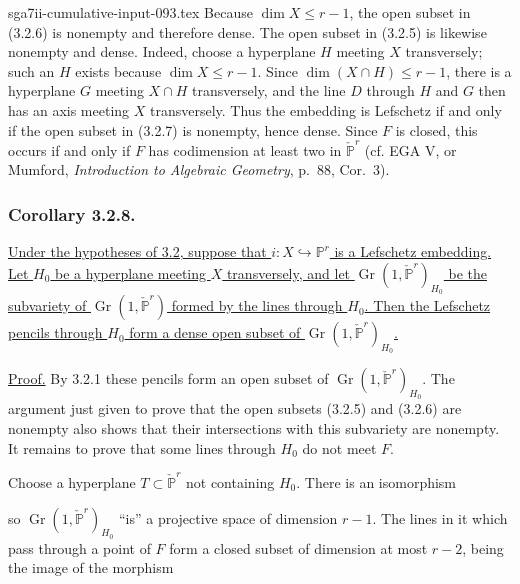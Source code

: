 \begin{filecontents*}{sga7ii-cumulative-input-093.tex}
Because $\dim X\leq r-1$, the open subset in (3.2.6) is nonempty and
therefore dense.  The open subset in (3.2.5) is likewise nonempty and
dense.  Indeed, choose a hyperplane $H$ meeting $X$ transversely; such
an $H$ exists because $\dim X\leq r-1$.  Since
$\dim(X\cap H)\leq r-1$, there is a hyperplane $G$ meeting
$X\cap H$ transversely, and the line $D$ through $H$ and $G$ then has
an axis meeting $X$ transversely.  Thus the embedding is Lefschetz if
and only if the open subset in (3.2.7) is nonempty, hence dense.  Since
$F$ is closed, this occurs if and only if $F$ has codimension at least
two in $\check{\mathbb P}^{r}$ (cf. EGA V, or Mumford,
\emph{Introduction to Algebraic Geometry}, p.~88, Cor.~3).

\subsubsection*{Corollary 3.2.8.}
\underline{Under the hypotheses of 3.2, suppose that
$i:X\hookrightarrow\mathbb P^r$ is a Lefschetz embedding.  Let $H_0$
be a hyperplane meeting $X$ transversely, and let
$\operatorname{Gr}(1,\check{\mathbb P}^{r})_{H_0}$ be the subvariety
of $\operatorname{Gr}(1,\check{\mathbb P}^{r})$ formed by the lines
through $H_0$.  Then the Lefschetz pencils through $H_0$ form a dense
open subset of $\operatorname{Gr}(1,\check{\mathbb P}^{r})_{H_0}$.}

\noindent\underline{Proof.}
By 3.2.1 these pencils form an open subset of
$\operatorname{Gr}(1,\check{\mathbb P}^{r})_{H_0}$.  The argument
just given to prove that the open subsets (3.2.5) and (3.2.6) are
nonempty also shows that their intersections with this subvariety are
nonempty.  It remains to prove that some lines through $H_0$ do not
meet $F$.

Choose a hyperplane $T\subset\check{\mathbb P}^{r}$ not containing
$H_0$.  There is an isomorphism
\begin{center}
\end{center}
so $\operatorname{Gr}(1,\check{\mathbb P}^{r})_{H_0}$ ``is'' a
projective space of dimension $r-1$.  The lines in it which pass
through a point of $F$ form a closed subset of dimension at most
$r-2$, being the image of the morphism
\begin{center}
\end{center}


\end{filecontents*}
